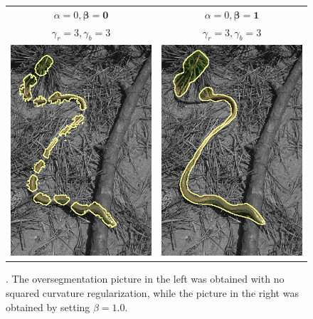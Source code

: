 \begin{figure}
\center
\begin{tabular}{cc}
$\alpha=0, \boldsymbol{\beta=0}$ & $\alpha=0, \boldsymbol{\beta=1}$\\
$\gamma_r = 3, \gamma_b = 3$ & $\gamma_r = 3, \gamma_b = 3$\\
 	\includegraphics[scale=0.25]{figures/chapter8/completion/graphseg/alpha-0.0/beta-0.0/gamma-3.0/radius-7/corrected-seg.png} & 
 	\includegraphics[scale=0.25]{figures/chapter8/completion/graphseg/alpha-0.0/beta-1.0/gamma-3.0/radius-7/corrected-seg.png}
\end{tabular}	
\caption{. The oversegmentation picture in the left was obtained with no squared curvature regularization, while the picture in the right was obtained by setting $\beta=1.0$. }
\label{ch8:fig:segmentation-curvature-completion}
\end{figure}

